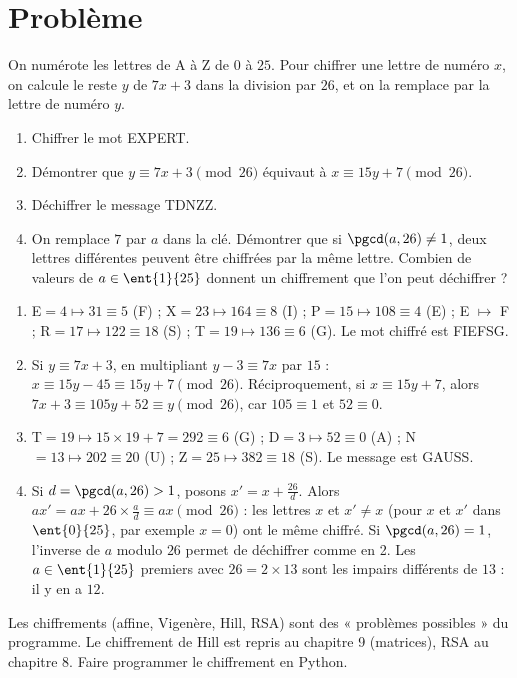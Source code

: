 \section{Problème}
\begin{problem}
On numérote les lettres de A à Z de $0$ à $25$. Pour chiffrer une lettre de numéro $x$, on calcule le reste $y$ de $7x+3$ dans la division par $26$, et on la remplace par la lettre de numéro $y$.
\begin{enumerate}
\item Chiffrer le mot EXPERT.
\item Démontrer que $y\equiv7x+3\pmod{26}$ équivaut à $x\equiv15y+7\pmod{26}$.
\item Déchiffrer le message TDNZZ.
\item On remplace $7$ par $a$ dans la clé. Démontrer que si $\pgcd(a,26)\neq1$, deux lettres différentes peuvent être chiffrées par la même lettre. Combien de valeurs de $a\in\ent{1}{25}$ donnent un chiffrement que l'on peut déchiffrer ?
\end{enumerate}
\end{problem}
\begin{solution}[Problème]
\begin{enumerate}
\item E$=4\mapsto31\equiv5$ (F) ; X$=23\mapsto164\equiv8$ (I) ; P$=15\mapsto108\equiv4$ (E) ; E $\mapsto$ F ; R$=17\mapsto122\equiv18$ (S) ; T$=19\mapsto136\equiv6$ (G). Le mot chiffré est FIEFSG.
\item Si $y\equiv7x+3$, en multipliant $y-3\equiv7x$ par $15$ : $x\equiv15y-45\equiv15y+7\pmod{26}$. Réciproquement, si $x\equiv15y+7$, alors $7x+3\equiv105y+52\equiv y\pmod{26}$, car $105\equiv1$ et $52\equiv0$.
\item T$=19\mapsto15\times19+7=292\equiv6$ (G) ; D$=3\mapsto52\equiv0$ (A) ; N$=13\mapsto202\equiv20$ (U) ; Z$=25\mapsto382\equiv18$ (S). Le message est GAUSS.
\item Si $d=\pgcd(a,26)>1$, posons $x'=x+\frac{26}d$. Alors $ax'=ax+26\times\frac ad\equiv ax\pmod{26}$ : les lettres $x$ et $x'\neq x$ (pour $x$ et $x'$ dans $\ent{0}{25}$, par exemple $x=0$) ont le même chiffré. Si $\pgcd(a,26)=1$, l'inverse de $a$ modulo $26$ permet de déchiffrer comme en 2. Les $a\in\ent{1}{25}$ premiers avec $26=2\times13$ sont les impairs différents de $13$ : il y en a $12$.
\end{enumerate}
\end{solution}
\begin{teachernote}
Les chiffrements (affine, Vigenère, Hill, RSA) sont des « problèmes possibles » du programme. Le chiffrement de Hill est repris au chapitre 9 (matrices), RSA au chapitre 8. Faire programmer le chiffrement en Python.
\end{teachernote}
